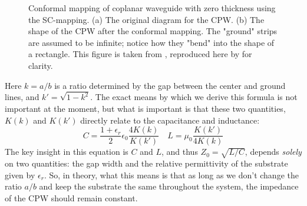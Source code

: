 \begin{figure}
	\centering
	\begin{subfigure}{0.4\textwidth}
		\caption{}
		\label{conformal-1}
	\end{subfigure}
	\hspace{2cm}
	\begin{subfigure}{0.4\textwidth}
		\caption{}
		\label{conformal-2}
	\end{subfigure}
	\caption{Conformal mapping of coplanar waveguide with zero thickness using the SC-mapping. (a) The
		original diagram for the CPW. (b) The shape of the CPW after the conformal mapping. The "ground"
		strips are assumed to be infinite; notice how they "bend" into the shape of a rectangle. This figure is
	taken from \cite{gaoPhysicsSuperconductingMicrowave}, reproduced here by for clarity.}          
	\label{cpw-conformal}
\end{figure}

Here \( k = a / b \) is a ratio determined by the gap between the center and ground lines, and \( k' =
\sqrt{1 - k^2} \). The exact means by which we derive this formula is not important at the moment, but what
is important is that these two quantities, \( K(k) \) and \( K(k') \) directly relate to the capacitance and
inductance:
\[
	C =\frac{1 + \epsilon_r}{2} \epsilon_0 \frac{4K(k)}{K(k')} \quad L = \mu_0 \frac{K(k')}{4K(k)}
\]
The key insight in this equation is \( C \) and \( L \), and thus \( Z_0 = \sqrt{L / C} \), depends
\textit{solely} on two quantities: the gap width and the relative permittivity of the substrate given by \(
\epsilon_r \). So, in theory, what this means is that as long as we don't change the ratio \( a / b \)
and keep the substrate the same throughout the system, the impedance of the CPW should remain constant.

